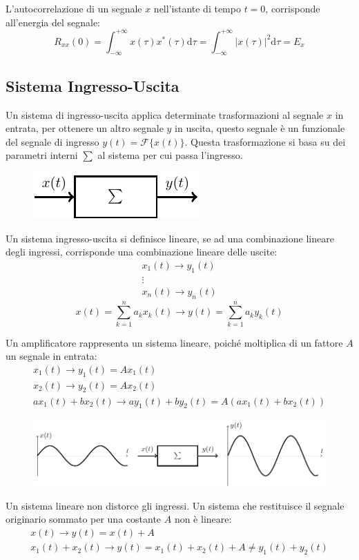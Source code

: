 \documentclass{article}
\newcommand{\df}{\mathrm{d}}
\numberwithin{equation}{subsection}
\begin{document}
L'autocorrelazione di un segnale $x$ nell'istante di tempo $t=0$, corrisponde all'energia del segnale:
\begin{equation}
    R_{xx}(0)=\displaystyle\int_{-\infty}^{+\infty}x(\tau)x^*(\tau)\df\tau=\int_{-\infty}^{+\infty}|x(\tau)|^2\df\tau=E_x
\end{equation}

\subsection{Sistema Ingresso-Uscita}

Un sistema di ingresso-uscita applica determinate trasformazioni al segnale $x$ in entrata, per ottenere un altro segnale $y$ in uscita, questo segnale è un funzionale 
del segnale di ingresso $y(t)=\mathcal{F}\{x(t)\}$. Questa trasformazione si basa su dei parametri interni $\sum$ al sistema per cui passa l'ingresso. 
\begin{figure}[H]%
    \centering
    \includegraphics{sistema-io.pdf}%
\end{figure}

Un sistema ingresso-uscita si definisce lineare, se ad una combinazione lineare degli ingressi, corrisponde una combinazione lineare delle uscite:
\begin{gather*}
    x_1(t)\to y_1(t)\\
    \vdots\\
    x_n(t)\to y_n(t)
\end{gather*}
\begin{equation}
    x(t)=\displaystyle\sum_{k=1}^{n}a_kx_k(t)\to y(t)=\sum_{k=1}^{n}a_ky_k(t)
\end{equation}

Un amplificatore rappresenta un sistema lineare, poiché moltiplica di un fattore $A$ un segnale in entrata:
\begin{gather*}
    x_1(t)\to y_1(t)=Ax_1(t)\\
    x_2(t)\to y_2(t)=Ax_2(t)\\
    ax_1(t)+bx_2(t)\to ay_1(t)+by_2(t)=A(ax_1(t)+bx_2(t))
\end{gather*} 
\begin{figure}[H]%
    \centering
    \includegraphics{amplificatore.pdf}%
\end{figure}
Un sistema lineare non distorce gli ingressi. Un sistema che restituisce il segnale originario sommato per una costante $A$ non è lineare:
\begin{gather*}
    x(t)\to y(t)=x(t)+A\\
    x_1(t)+x_2(t)\to y(t)=x_1(t)+x_2(t)+A\neq y_1(t)+y_2(t)
\end{gather*}
\end{document}
